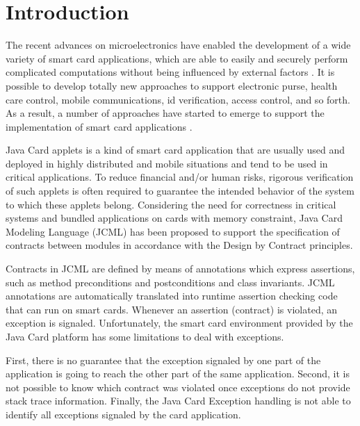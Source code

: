 \documentclass[10pt, conference, compsocconf]{IEEEtran}
\begin{document}
% 


\IEEEpeerreviewmaketitle


 
\section{Introduction}

The recent advances on microelectronics have enabled the development of a wide
variety of smart card applications, which are able to easily and securely
perform complicated computations without being influenced by external factors
\cite{Rankl}. It is possible to develop totally new approaches to support
electronic purse, health care control, mobile communications, id verification,
access control, and so forth. As a result, a number of approaches have started
to emerge to support the implementation of smart card applications
\cite{Krakatoa} \cite{CostaMMN09} \cite{CostaMMN12}.

Java Card applets \cite{Chen:2000} is a kind of smart card application that are usually
used and deployed in highly distributed and mobile situations and tend to be
used in critical applications. To reduce financial and/or human risks, rigorous
verification of such applets is often required to guarantee the intended
behavior of the system to which these applets belong. Considering the need for
correctness in critical systems and bundled applications on cards with memory
constraint, Java Card Modeling Language (JCML) \cite{CostaMMN09}
\cite{CostaMMN12} has been proposed to support the specification of contracts between modules in accordance with the
Design by Contract \cite{Meyer92} principles.

Contracts in JCML are defined by means of annotations which express assertions,
such as method preconditions and postconditions and class invariants. JCML
annotations are automatically translated into runtime assertion checking code
that can run on smart cards. Whenever an assertion (contract) is violated, an
exception is signaled. Unfortunately, the smart card environment provided by the
Java Card platform has some limitations to deal with exceptions.

First, there is no guarantee that the exception signaled by one part of the
application is going to reach the other part of the same application. Second,
it is not possible to know which contract was violated once exceptions do not
provide stack trace information. Finally, the Java Card Exception handling is
not able to identify all exceptions signaled by the card application.   
\end{document}
